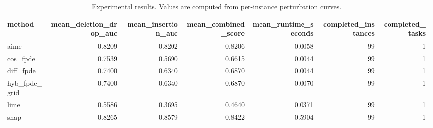 \begin{table}[t]
\caption{Experimental results. Values are computed from per-instance perturbation curves.}
\label{tab:main_results_computed}
\centering
\begin{tabular}{lrrrrrr}
\toprule
method & mean\_deletion\_drop\_auc & mean\_insertion\_auc & mean\_combined\_score & mean\_runtime\_seconds & completed\_instances & completed\_tasks \\
\midrule
aime & 0.8209 & 0.8202 & 0.8206 & 0.0058 & 99 & 1 \\
cos\_fpde & 0.7539 & 0.5690 & 0.6615 & 0.0044 & 99 & 1 \\
diff\_fpde & 0.7400 & 0.6340 & 0.6870 & 0.0044 & 99 & 1 \\
hyb\_fpde\_grid & 0.7400 & 0.6340 & 0.6870 & 0.0070 & 99 & 1 \\
lime & 0.5586 & 0.3695 & 0.4640 & 0.0371 & 99 & 1 \\
shap & 0.8265 & 0.8579 & 0.8422 & 0.5904 & 99 & 1 \\
\bottomrule
\end{tabular}

\end{table}
